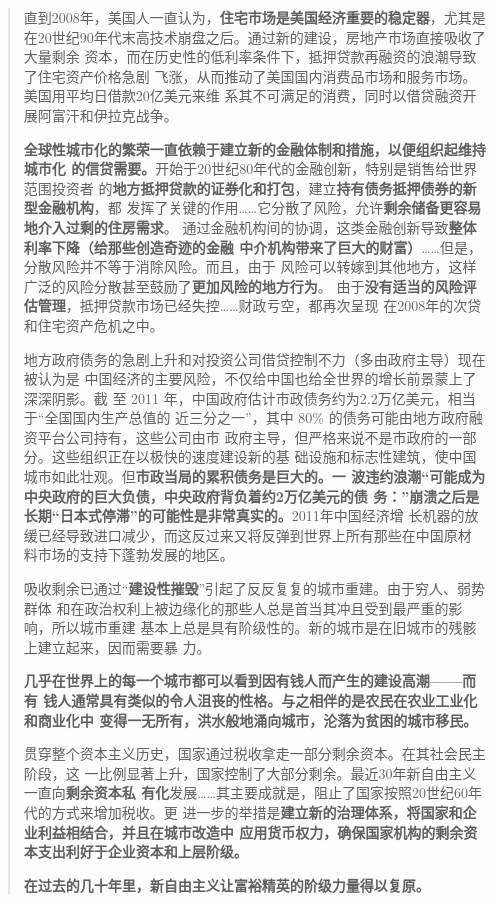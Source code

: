 \begin{quotation}
  直到2008年，美国人一直认为，\textbf{住宅市场是美国经济重要的稳定器}，尤其是
  在20世纪90年代末高技术崩盘之后。通过新的建设，房地产市场直接吸收了大量剩余
  资本，而在历史性的低利率条件下，抵押贷款再融资的浪潮导致了住宅资产价格急剧
  飞涨，从而推动了美国国内消费品市场和服务市场。美国用平均日借款20亿美元来维
  系其不可满足的消费，同时以借贷融资开展阿富汗和伊拉克战争。

  \textbf{全球性城市化的繁荣一直依赖于建立新的金融体制和措施，以便组织起维持城市化
    的信贷需要。}开始于20世纪80年代的金融创新，特别是销售给世界范围投资者
  的\textbf{地方抵押贷款的证券化和打包}，建立\textbf{持有债务抵押债券的新型金融机构}，都
  发挥了关键的作用……它分散了风险，允许\textbf{剩余储备更容易地介入过剩的住房需求}。
  通过金融机构间的协调，这类金融创新导致\textbf{整体利率下降（给那些创造奇迹的金融
    中介机构带来了巨大的财富）}……但是，分散风险并不等于消除风险。而且，由于
  风险可以转嫁到其他地方，这样广泛的风险分散甚至鼓励了\textbf{更加风险的地方行为}。
  由于\textbf{没有适当的风险评估管理}，抵押贷款市场已经失控……财政亏空，都再次呈现
  在2008年的次贷和住宅资产危机之中。

  地方政府债务的急剧上升和对投资公司借贷控制不力（多由政府主导）现在被认为是
  中国经济的主要风险，不仅给中国也给全世界的增长前景蒙上了深深阴影。截
  至 2011 年，中国政府估计市政债务约为2.2万亿美元，相当于“全国国内生产总值的
  近三分之一”，其中 80\% 的债务可能由地方政府融资平台公司持有，这些公司由市
  政府主导，但严格来说不是市政府的一部分。这些组织正在以极快的速度建设新的基
  础设施和标志性建筑，使中国城市如此壮观。但\textbf{市政当局的累积债务是巨大的。一
    波违约浪潮“可能成为中央政府的巨大负债，中央政府背负着约2万亿美元的债
    务：”崩溃之后是长期“日本式停滞”的可能性是非常真实的。}2011年中国经济增
  长机器的放缓已经导致进口减少，而这反过来又将反弹到世界上所有那些在中国原材
  料市场的支持下蓬勃发展的地区。

  吸收剩余已通过“\textbf{建设性摧毁}”引起了反反复复的城市重建。由于穷人、弱势群体
  和在政治权利上被边缘化的那些人总是首当其冲且受到最严重的影响，所以城市重建
  基本上总是具有阶级性的。新的城市是在旧城市的残骸上建立起来，因而需要暴
  力。

  \textbf{几乎在世界上的每一个城市都可以看到因有钱人而产生的建设高潮——而有
    钱人通常具有类似的令人沮丧的性格。与之相伴的是农民在农业工业化和商业化中
    变得一无所有，洪水般地涌向城市，沦落为贫困的城市移民。}

  贯穿整个资本主义历史，国家通过税收拿走一部分剩余资本。在其社会民主阶段，这
  一比例显著上升，国家控制了大部分剩余。最近30年新自由主义一直向\textbf{剩余资本私
    有化}发展……其主要成就是，阻止了国家按照20世纪60年代的方式来增加税收。更
  进一步的举措是\textbf{建立新的治理体系，将国家和企业利益相结合，并且在城市改造中
    应用货币权力，确保国家机构的剩余资本支出利好于企业资本和上层阶级。}

  \textbf{在过去的几十年里，新自由主义让富裕精英的阶级力量得以复原。}
\end{quotation}


